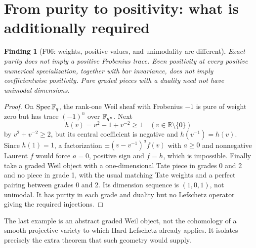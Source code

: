 \documentclass[11pt,a4paper]{article}
\newcommand{\fid}[1]{\textsf{#1}}\newcommand{\gate}[1]{\textsf{#1}}
\theoremstyle{named}\newtheorem{finding}{Finding}[section]
\theoremstyle{definition}\newtheorem{definition}[finding]{Definition}
\theoremstyle{remark}\newtheorem{remark}[finding]{Remark}
\begin{document}
\section{From purity to positivity: what is additionally required}\label{sec:positivity}
\begin{finding}[\fid{F06}: weights, positive values, and unimodality are different]\label{f:phase}
Exact purity does not imply a positive Frobenius trace. Even positivity at every positive numerical specialization, together with bar invariance, does not imply coefficientwise positivity. Pure graded pieces with a duality need not have unimodal dimensions.
\end{finding}
\begin{proof}
On $\operatorname{Spec}\mathbb F_q$, the rank-one Weil sheaf with Frobenius $-1$ is pure of weight zero but has trace $(-1)^n$ over $\mathbb F_{q^n}$. Next
\[
 h(v)=v^2-1+v^{-2}\ge1\quad(v\in\mathbb R\setminus\{0\})
\]
by $v^2+v^{-2}\ge2$, but its central coefficient is negative and $h(v^{-1})=h(v)$. Since $h(1)=1$, a factorization $\pm(v-v^{-1})^a f(v)$ with $a\ge0$ and nonnegative Laurent $f$ would force $a=0$, positive sign and $f=h$, which is impossible. Finally take a graded Weil object with a one-dimensional Tate piece in grades 0 and 2 and no piece in grade 1, with the usual matching Tate weights and a perfect pairing between grades 0 and 2. Its dimension sequence is $(1,0,1)$, not unimodal. It has purity in each grade and duality but no Lefschetz operator giving the required injections.
\end{proof}
The last example is an abstract graded Weil object, not the cohomology of a smooth projective variety to which Hard Lefschetz already applies. It isolates precisely the extra theorem that such geometry would supply.
\end{document}
